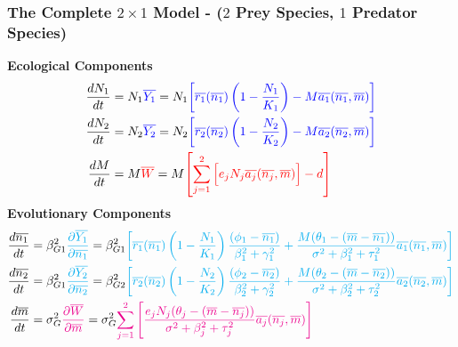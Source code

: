 \documentclass[10pt]{beamer}
\begin{document}
\begin{frame}
	\frametitle{The Complete $2\times 1$ Model - \normalsize($2$ Prey Species, $1$ Predator Species)}
	{\bf Ecological Components}
	{\footnotesize\begin{align*}
		\frac{dN_1}{dt} &= N_1{\color{blue}\overline{Y_1}} = N_1 {\color{blue}\left[{\color{blue}\overline{r_1}(\overline{n_1})\left(1 - \frac{N_1}{K_1}\right) - M\overline{a_1}(\overline{n_1}, \overline{m})}\right]} \\
		\frac{dN_2}{dt} &= N_2{\color{blue}\overline{Y_2}} = N_2 {\color{blue}\left[{\color{blue}\overline{r_2}(\overline{n_2})\left(1 - \frac{N_2}{K_2}\right) - M\overline{a_2}(\overline{n_2}, \overline{m})}\right]} \\
		\frac{dM}{dt} &= M{\color{red}\overline{W}} = M {\color{red}\left[\sum\limits_{j = 1}^{2}\Big[e_{j}N_j\overline{a_j}(\overline{n_j}, \overline{m})\Big] - d\right]}
	\end{align*}}%
	{\bf Evolutionary Components}
	{\footnotesize\begin{align*}
		\frac{d\overline{n_1}}{dt} &= \beta_{G1}^2{\color{cyan}\frac{\partial \overline{Y_1}}{\partial \overline{n_1}}} = \beta_{G1}^2{\color{cyan}\left[\overline{r_1}(\overline{n_1})\left(1 - \frac{N_1}{K_1}\right)\frac{(\phi_1 - \overline{n_1})}{\beta_1^2 + \gamma_1^2} + \frac{M(\theta_{1} - (\overline{m} - \overline{n_1}))}{\sigma^2 + \beta_1^2 + \tau_{1}^2} \overline{a_1}(\overline{n_1}, \overline{m})\right]}\\
		\frac{d\overline{n_2}}{dt} &= \beta_{G1}^2{\color{cyan}\frac{\partial \overline{Y_2}}{\partial \overline{n_2}}} = \beta_{G2}^2{\color{cyan}\left[\overline{r_2}(\overline{n_2})\left(1 - \frac{N_2}{K_2}\right)\frac{(\phi_2 - \overline{n_2})}{\beta_2^2 + \gamma_2^2} + \frac{M(\theta_{2} - (\overline{m} - \overline{n_2}))}{\sigma^2 + \beta_2^2 + \tau_{2}^2} \overline{a_2}(\overline{n_2}, \overline{m})\right]}\\
		\frac{d\overline{m}}{dt} &= \sigma_{G}^2{\color{magenta}\frac{\partial\overline{W}}{\partial\overline{m}}} = \sigma_{G}^2{\color{magenta}\sum\limits_{j=1}^{2}\left[\frac{e_{j}N_j(\theta_{j} - (\overline{m} - \overline{n_j}))}{\sigma^2 + \beta_j^2 + \tau_{j}^2} \overline{a_j}(\overline{n_j}, \overline{m})\right]}
	\end{align*}}%
\end{frame}
\end{document}
